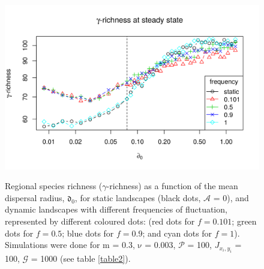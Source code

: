 \documentclass[a4paper,12pt]{article}
\begin{document}
\begin{figure}[hb!]
\begin{center}
\includegraphics[width=\textwidth]{newfigures/steadyState_rich.png}
\label{fig:Richness}
\caption{Regional species richness ($\gamma$-richness) as a function of the mean dispersal radius, $\mathfrak{d_{0}}$, for static landscapes (black dots, $\mathcal{A}$ = 0), and dynamic landscapes with different frequencies of fluctuation, represented by different coloured dots: (red dots for $f = 0.101$; green dots for $f = 0.5$; blue dots for $f = 0.9$; and cyan dots for $f = 1$). Simulations were done for $\mathrm{m}$ = 0.3, $\mathrm{\nu}$ = 0.003, $\mathcal{P}$ = 100, $J_{x_i,y_i}$ = 100, $\mathcal{G}$ = 1000 (see table \ref{table2}).}
\end{center}
\end{figure}
\end{document}
